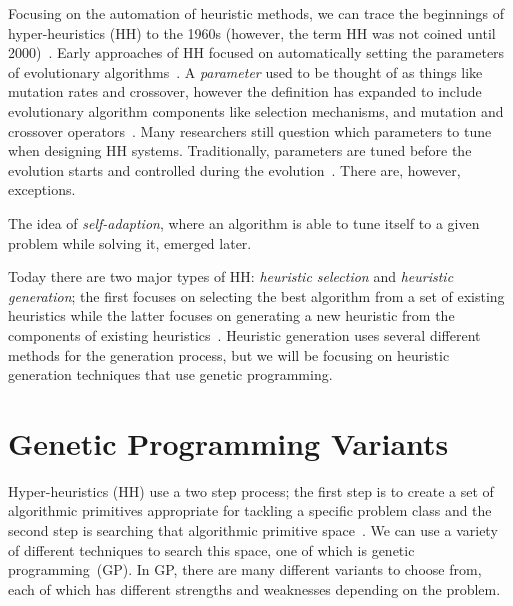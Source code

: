 \documentclass{sig-alternate}
\begin{document}
Focusing on the automation of heuristic methods, we can trace the beginnings of hyper-heuristics (HH) to the 1960s (however, the term HH was not coined until 2000)~\cite{pappa:2014}. Early approaches of HH focused on automatically setting the parameters of evolutionary algorithms~\cite{pappa:2014}. A \textit{parameter} used to be thought of as things like mutation rates and crossover, however the definition has expanded to include evolutionary algorithm components like selection mechanisms, and mutation and crossover operators~\cite{pappa:2014}. Many researchers still question which parameters to tune when designing HH systems. Traditionally, parameters are tuned before the evolution starts and controlled during the evolution~\cite{pappa:2014}. There are, however, exceptions.

The idea of \textit{self-adaption}, where an algorithm is able to tune itself to a given problem while solving it, emerged later.

Today there are two major types of HH: \textit{heuristic selection} and \textit{heuristic generation}; the first focuses on selecting the best algorithm from a set of existing heuristics while the latter focuses on generating a new heuristic from the components of existing heuristics~\cite{pappa:2014}. Heuristic generation uses several different methods for the generation process, but we will be focusing on heuristic generation techniques that use genetic programming.

\section{Genetic Programming Variants}
\label{sec:gpvariants}
Hyper-heuristics (HH) use a two step process; the first step is to create a set of algorithmic primitives appropriate for tackling a specific problem class and the second step is searching that algorithmic primitive space~\cite{harris:2015}. We can use a variety of different techniques to search this space, one of which is genetic programming~(GP). In GP, there are many different variants to choose from, each of which has different strengths and weaknesses depending on the problem.
\end{document}

